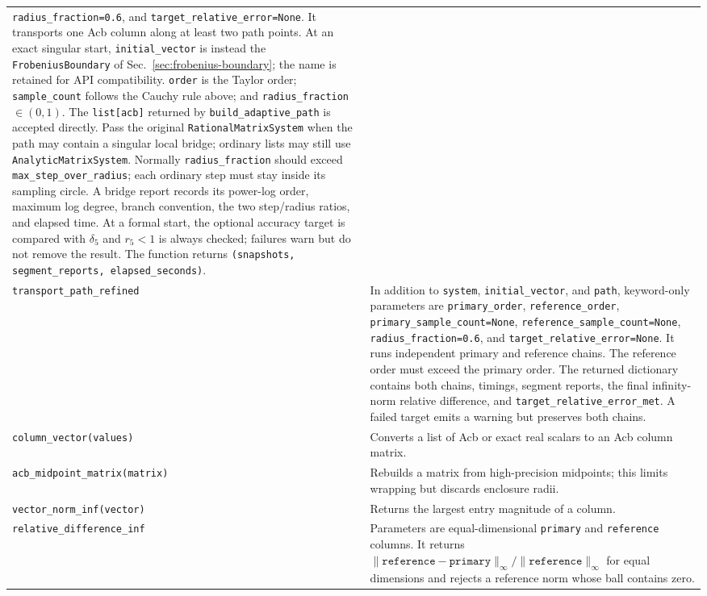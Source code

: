 \documentclass[11pt]{article}
\begin{document}
\begin{longtable}{L{0.36\textwidth}L{0.58\textwidth}}
\texttt{radius\_fraction=0.6}, and \texttt{target\_relative\_error=None}.  It transports one Acb column along at least two path points.
At an exact singular start, \texttt{initial\_vector} is instead the
\texttt{FrobeniusBoundary} of Sec.~\ref{sec:frobenius-boundary}; the name is retained for API
compatibility.
\texttt{order} is the Taylor
order; \texttt{sample\_count} follows the Cauchy rule above; and
\texttt{radius\_fraction}\,$\in(0,1)$.  The \texttt{list[acb]} returned by
\texttt{build\_adaptive\_path} is accepted directly.  Pass the original
\texttt{RationalMatrixSystem} when the path may contain a singular local bridge; ordinary
lists may still use \texttt{AnalyticMatrixSystem}.  Normally \texttt{radius\_fraction}
should exceed \texttt{max\_step\_over\_radius}; each ordinary step must stay inside its
sampling circle.  A bridge report records its power-log order, maximum log degree, branch
convention, the two step/radius ratios, and elapsed time.  At a formal start, the optional
accuracy target is compared with $\delta_5$ and $r_5<1$ is always checked; failures warn but
do not remove the result.  The function returns
\texttt{(snapshots, segment\_reports, elapsed\_seconds)}. \\
\texttt{transport\_path\_refined} & In addition to \texttt{system},
\texttt{initial\_vector}, and \texttt{path}, keyword-only parameters are
\texttt{primary\_order}, \texttt{reference\_order},
\texttt{primary\_sample\_count=None}, \texttt{reference\_sample\_count=None},
\texttt{radius\_fraction=0.6}, and \texttt{target\_relative\_error=None}.  It runs independent primary and reference chains.
The reference order must exceed the primary order.  The returned dictionary contains both
chains, timings, segment reports, the final infinity-norm relative difference, and
\texttt{target\_relative\_error\_met}.  A failed target emits a warning but preserves both chains. \\
\texttt{column\_vector(values)} & Converts a list of Acb or exact real scalars to an Acb
column matrix. \\
\texttt{acb\_midpoint\_matrix(matrix)} & Rebuilds a matrix from high-precision midpoints;
this limits wrapping but discards enclosure radii. \\
\texttt{vector\_norm\_inf(vector)} & Returns the largest entry magnitude of a column. \\
\texttt{relative\_difference\_inf} & Parameters are equal-dimensional \texttt{primary} and
\texttt{reference} columns.  It returns
$\|\texttt{reference}-\texttt{primary}\|_\infty/\|\texttt{reference}\|_\infty$ for equal
dimensions and rejects a reference norm whose ball contains zero. \\
\bottomrule
\end{longtable}
\normalsize
\end{document}
